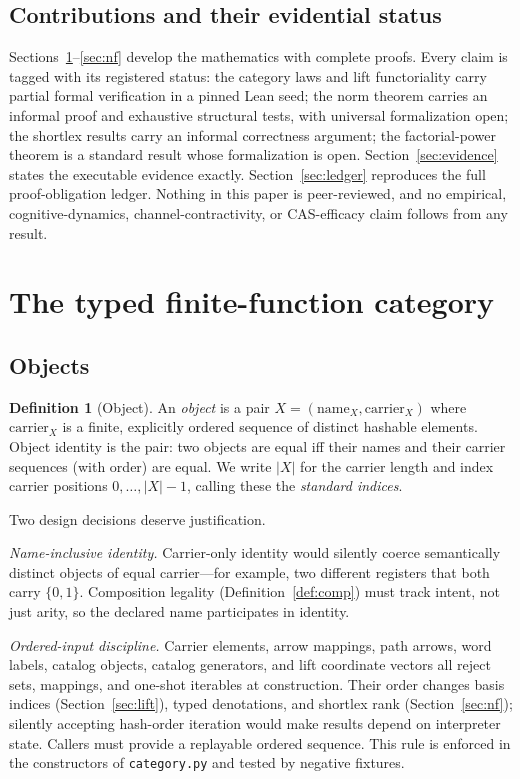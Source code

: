 \documentclass[11pt]{amsart}
\theoremstyle{definition}
\newtheorem{definition}[theorem]{Definition}
\theoremstyle{remark}
\begin{document}
\subsection{Contributions and their evidential status}
Sections~\ref{sec:category}--\ref{sec:nf} develop the mathematics with complete proofs. Every claim is tagged with its registered status: the category laws and lift functoriality carry partial formal verification in a pinned Lean seed; the norm theorem carries an informal proof and exhaustive structural tests, with universal formalization open; the shortlex results carry an informal correctness argument; the factorial-power theorem is a standard result whose formalization is open. Section~\ref{sec:evidence} states the executable evidence exactly. Section~\ref{sec:ledger} reproduces the full proof-obligation ledger. Nothing in this paper is peer-reviewed, and no empirical, cognitive-dynamics, channel-contractivity, or CAS-efficacy claim follows from any result.

\section{The typed finite-function category}\label{sec:category}

\subsection{Objects}

\begin{definition}[Object]\label{def:object}
An \emph{object} is a pair $X=(\mathrm{name}_X,\mathrm{carrier}_X)$ where $\mathrm{carrier}_X$ is a finite, explicitly ordered sequence of distinct hashable elements. Object identity is the pair: two objects are equal iff their names and their carrier sequences (with order) are equal. We write $|X|$ for the carrier length and index carrier positions $0,\dots,|X|-1$, calling these the \emph{standard indices}.
\end{definition}

Two design decisions deserve justification.

\emph{Name-inclusive identity.} Carrier-only identity would silently coerce semantically distinct objects of equal carrier---for example, two different registers that both carry $\{0,1\}$. Composition legality (Definition~\ref{def:comp}) must track intent, not just arity, so the declared name participates in identity.

\emph{Ordered-input discipline.} Carrier elements, arrow mappings, path arrows, word labels, catalog objects, catalog generators, and lift coordinate vectors all reject sets, mappings, and one-shot iterables at construction. Their order changes basis indices (Section~\ref{sec:lift}), typed denotations, and shortlex rank (Section~\ref{sec:nf}); silently accepting hash-order iteration would make results depend on interpreter state. Callers must provide a replayable ordered sequence. This rule is enforced in the constructors of \texttt{category.py} and tested by negative fixtures.
\end{document}
